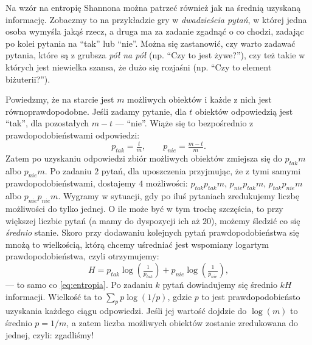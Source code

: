 \documentclass[10pt,a4paper]{article}
\begin{document}
Na wzór na entropię Shannona można patrzeć również jak na średnią uzyskaną informację.
Zobaczmy to na przykładzie gry w \emph{dwadzieścia pytań}, w której jedna osoba wymyśla jakąś rzecz, a  druga ma za zadanie zgadnąć o co chodzi, zadając po kolei pytania na ``tak'' lub ``nie''.
Można się zastanowić, czy warto zadawać pytania, które są z grubsza \emph{pół na pół} (np. ``Czy to jest żywe?''), czy też takie w których jest niewielka szansa, że dużo się rozjaśni (np. ``Czy to element biżuterii?'').

Powiedzmy, że na starcie jest $m$ możliwych obiektów i każde z nich jest równoprawdopodobne.
Jeśli zadamy pytanie, dla $t$ obiektów odpowiedzią jest ``tak'', dla pozostałych $m-t$ --- ``nie''.
Wiąże się to bezpośrednio z prawdopodobieństwami odpowiedzi:
%
\begin{equation}
    p_{tak} = \tfrac{t}{m}, \qquad p_{nie} = \tfrac{m-t}{m}.
\end{equation}
%
Zatem po uzyskaniu odpowiedzi zbiór możliwych obiektów zmiejsza się do $p_{tak} m$ albo $p_{nie} m$.
Po zadaniu $2$ pytań, dla uposzczenia przyjmując, że z tymi samymi prawdopodobieństwami, dostajemy $4$ możliwości:
$p_{tak} p_{tak} m$, $p_{nie} p_{tak} m$, $p_{tak} p_{nie} m$ albo $p_{nie} p_{nie} m$.
Wygramy w sytuacji, gdy po iluś pytaniach zredukujemy liczbę możliwości do tylko jednej.
O ile może być w tym trochę szczęścia, to przy większej liczbie pytań (a mamy do dyspozycji ich aż $20$), możemy śledzić co się \emph{średnio} stanie.
Skoro przy dodawaniu kolejnych pytań prawdopodobieństwa się mnożą to wielkością, którą chcemy uśredniać jest wspomiany logartym prawdopodobieństwa, czyli otrzymujemy:
%
\begin{equation}
    H = p_{tak} \log \left(\tfrac{1}{p_{tak}} \right) + p_{nie} \log \left(\tfrac{1}{p_{nie}} \right),
\end{equation}
%
--- to samo co \eqref{eq:entropia}.
Po zadaniu $k$ pytań dowiadujemy się średnio $k H$ informacji.
Wielkość ta to $\sum_p p \log(1/p)$, gdzie $p$ to jest prawdopodobieństo uzyskania każdego ciągu odpowiedzi.
Jeśli jej wartość dojdzie do $\log(m)$ to średnio $p = 1/m$, a zatem liczba możliwych obiektów zostanie zredukowana do jednej, czyli: zgadliśmy!
%
\end{document}
